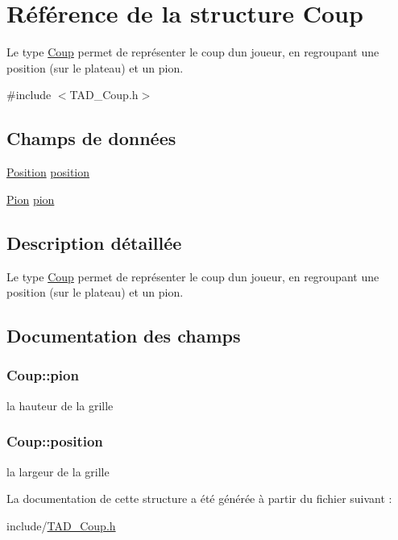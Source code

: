 \hypertarget{structCoup}{}\section{Référence de la structure Coup}
\label{structCoup}


Le type \hyperlink{structCoup}{Coup} permet de représenter le coup d\textquotesingle{}un joueur, en regroupant une position (sur le plateau) et un pion.  




{\ttfamily \#include $<$T\+A\+D\+\_\+\+Coup.\+h$>$}

\subsection*{Champs de données}
\begin{DoxyCompactItemize}
\item 
\hyperlink{structPosition}{Position} \hyperlink{structCoup_a53a5b29ee8fde3fa1c9fbc220e2f5a56}{position}
\item 
\hyperlink{structPion}{Pion} \hyperlink{structCoup_a7ea419a72425aac1787544df22a9d159}{pion}
\end{DoxyCompactItemize}


\subsection{Description détaillée}
Le type \hyperlink{structCoup}{Coup} permet de représenter le coup d\textquotesingle{}un joueur, en regroupant une position (sur le plateau) et un pion. 

\subsection{Documentation des champs}
\hypertarget{structCoup_a7ea419a72425aac1787544df22a9d159}{}
\subsubsection[{pion}]{ Coup\+::pion}\label{structCoup_a7ea419a72425aac1787544df22a9d159}
la hauteur de la grille \hypertarget{structCoup_a53a5b29ee8fde3fa1c9fbc220e2f5a56}{}
\subsubsection[{position}]{ Coup\+::position}\label{structCoup_a53a5b29ee8fde3fa1c9fbc220e2f5a56}
la largeur de la grille 

La documentation de cette structure a été générée à partir du fichier suivant \+:\begin{DoxyCompactItemize}
\item 
include/\hyperlink{TAD__Coup_8h}{T\+A\+D\+\_\+\+Coup.\+h}\end{DoxyCompactItemize}

